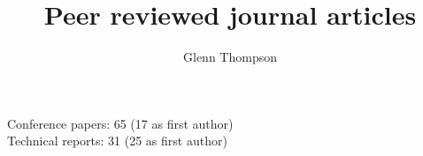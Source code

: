 \documentclass[12pt]{article}
\title{Peer reviewed journal articles}
\author{Glenn Thompson}
\begin{document}
\printbibliography[title={Refereed Journal Articles}]
Conference papers: 65 (17 as first author)
\\ 
Technical reports: 31 (25 as first author)
\\ 
\end{document}
